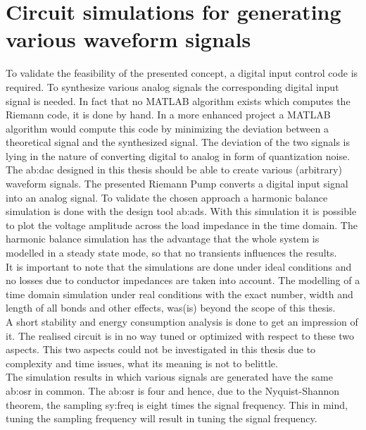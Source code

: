 \chapter{Circuit simulations for generating various waveform signals}
To validate the feasibility of the presented concept, a digital input control code is required.
To synthesize various analog signals the corresponding digital input signal is needed. 
In fact that no MATLAB algorithm exists which computes the Riemann code, it is done by hand. 
In a more enhanced project a MATLAB algorithm would compute this code by minimizing the deviation between a theoretical signal and the synthesized signal.
 The deviation of the two signals is lying in the nature of converting digital to analog in form of quantization noise.
The \gls{ab:dac} designed in this thesis should be able to create various (arbitrary) waveform signals.
The presented Riemann Pump converts a digital input signal into an analog signal.
 To validate the chosen approach a harmonic balance simulation is done with the design tool \gls{ab:ads}.
  With this simulation it is possible to plot the voltage amplitude across the load impedance in the time domain.
   The harmonic balance simulation has the advantage that the whole system is modelled in a steady state mode, so that no transients influences the results.\\
    It is important to note that the simulations are done under ideal conditions and no losses due to conductor impedances are taken into account.
    The modelling of a time domain simulation under real conditions with the exact number, width and length of all bonds and other effects, was(is) beyond the scope of this thesis.\\
    A short stability and energy consumption analysis is done to get an impression of it. 
    The realised circuit is in no way tuned or optimized with respect to these two aspects.
     This two aspects could not be investigated in this thesis due to complexity and time issues, what its meaning is not to belittle.\\
    
The simulation results in which various signals are generated have the same \gls{ab:osr} in common.
The \gls{ab:osr} is four and hence, due to the Nyquist-Shannon theorem, the sampling \gls{sy:freq} is eight times the signal frequency.
This in mind, tuning the sampling frequency will result in tuning the signal frequency. 

